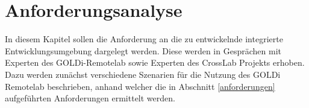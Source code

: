 \chapter{Anforderungsanalyse} \label{anforderungsanalyse}

In diesem Kapitel sollen die Anforderung an die zu entwickelnde integrierte Entwicklungsumgebung dargelegt werden. Diese werden in Gesprächen mit Experten des GOLDi-Remotelab sowie Experten des CrossLab Projekts erhoben. Dazu werden zunächst verschiedene Szenarien für die Nutzung des GOLDi Remotelab beschrieben, anhand welcher die in Abschnitt \ref{anforderungen} aufgeführten Anforderungen ermittelt werden.




